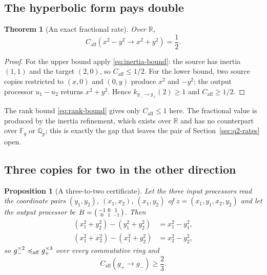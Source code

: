 \documentclass[11pt]{article}
\theoremstyle{definition}
\theoremstyle{plain}
\newtheorem{proposition}[definition]{Proposition}
\newtheorem{theorem}[definition]{Theorem}
\theoremstyle{remark}
\newcommand{\F}{\mathbb F}
\newcommand{\Q}{\mathbb Q}
\newcommand{\R}{\mathbb R}
\newcommand{\impl}{\preccurlyeq}
\newcommand{\caff}{C_{\mathrm{aff}}}
\begin{document}
\subsection{The hyperbolic form pays double}

\begin{theorem}[An exact fractional rate]
\label{thm:hyperbolic-to-definite}
Over \(\R\),
\[
  \caff(x^2-y^2\to x^2+y^2)=\frac12 .
\]
\end{theorem}

\begin{proof}
For the upper bound apply \eqref{eq:inertia-bound}: the source has inertia
\((1,1)\) and the target \((2,0)\), so \(\caff\le1/2\).  For the lower bound,
two source copies restricted to \((x,0)\) and \((0,y)\) produce \(x^2\) and
\(-y^2\); the output processor \(u_1-u_2\) returns \(x^2+y^2\).  Hence
\(k_{g_-\to g_+}(2)\ge1\) and \(\caff\ge1/2\).
\end{proof}

The rank bound \eqref{eq:rank-bound} gives only \(\caff\le1\) here.  The
fractional value is produced by the inertia refinement, which exists over
\(\R\) and has no counterpart over \(\F_q\) or \(\Q_p\); this is exactly the
gap that leaves the pair of Section~\ref{sec:q2-rates} open.

\subsection{Three copies for two in the other direction}

\begin{proposition}[A three-to-two certificate]
\label{prop:three-for-two}
Let the three input processors read the coordinate pairs \((y_1,y_2)\),
\((x_1,x_2)\), \((x_1,y_2)\) of \(z=(x_1,y_1,x_2,y_2)\) and let the output
processor be \(B=\begin{psmallmatrix}-1&0&1\\0&1&-1\end{psmallmatrix}\).  Then
\begin{equation}
  \begin{aligned}
    (x_1^2+y_2^2)-(y_1^2+y_2^2)&=x_1^2-y_1^2,\\
    (x_1^2+x_2^2)-(x_1^2+y_2^2)&=x_2^2-y_2^2,
  \end{aligned}
  \label{eq:three-for-two}
\end{equation}
so \(g_-^{\times2}\impl_{\rm aff}g_+^{\times3}\) over every commutative ring
and
\[
  \caff(g_+\to g_-)\ge\frac23 .
\]
\end{proposition}
\end{document}
